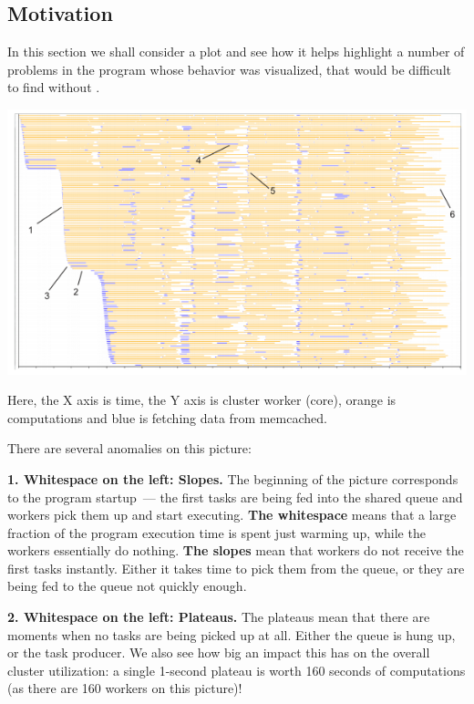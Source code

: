 \documentclass{article}
\begin{document}
\pagebreak
\subsection{Motivation}
\label{sec:splot-motivation}
In this section we shall consider a plot and see how it helps highlight a number of problems in the program whose behavior was visualized, that would be difficult to find without \splot{}.

\centerline{\includegraphics[width=\textwidth]{pics/splot/splot-main-example-analyzed.png}}

Here, the X axis is time, the Y axis is cluster worker (core), orange is computations and blue is fetching data from memcached.

There are several anomalies on this picture:

\vspace{3mm}

\textbf{1. Whitespace on the left: Slopes.} The beginning of the picture corresponds to the program startup~--- the first tasks are being fed into the shared queue and workers pick them up and start executing. \textbf{The whitespace} means that a large fraction of the program execution time is spent just warming up, while the workers essentially do nothing. \textbf{The slopes} mean that workers do not receive the first tasks instantly. Either it takes time to pick them from the queue, or they are being fed to the queue not quickly enough.

\textbf{2. Whitespace on the left: Plateaus.} The plateaus mean that there are moments when no tasks are being picked up at all. Either the queue is hung up, or the task producer. We also see how big an impact this has on the overall cluster utilization: a single 1-second plateau is worth 160 seconds of computations (as there are 160 workers on this picture)!
\end{document}
